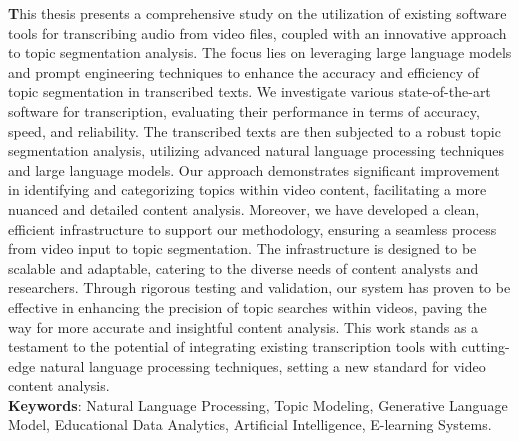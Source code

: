 \textbf This thesis presents a comprehensive study on the utilization of existing software tools for transcribing audio from video files, coupled with an innovative approach to topic segmentation analysis. The focus lies on leveraging large language models and prompt engineering techniques to enhance the accuracy and efficiency of topic segmentation in transcribed texts. We investigate various state-of-the-art software for transcription, evaluating their performance in terms of accuracy, speed, and reliability. The transcribed texts are then subjected to a robust topic segmentation analysis, utilizing advanced natural language processing techniques and large language models. Our approach demonstrates significant improvement in identifying and categorizing topics within video content, facilitating a more nuanced and detailed content analysis. Moreover, we have developed a clean, efficient infrastructure to support our methodology, ensuring a seamless process from video input to topic segmentation. The infrastructure is designed to be scalable and adaptable, catering to the diverse needs of content analysts and researchers. Through rigorous testing and validation, our system has proven to be effective in enhancing the precision of topic searches within videos, paving the way for more accurate and insightful content analysis. This work stands as a testament to the potential of integrating existing transcription tools with cutting-edge natural language processing techniques, setting a new standard for video content analysis.\\
\textbf{Keywords}:  Natural Language Processing, Topic Modeling, Generative Language Model, Educational Data Analytics, Artificial Intelligence, E-learning Systems.



